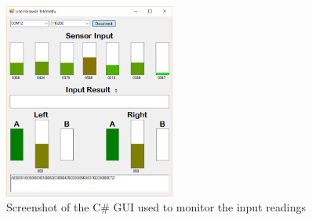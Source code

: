 \begin{figure}[h!]
  \centering
  \includegraphics[width=0.5\textwidth]{figures/sensorsonwhite.png}  
\caption{Screenshot of the C\# GUI used to monitor the input readings}  
  \label{The GUI}
\end{figure}